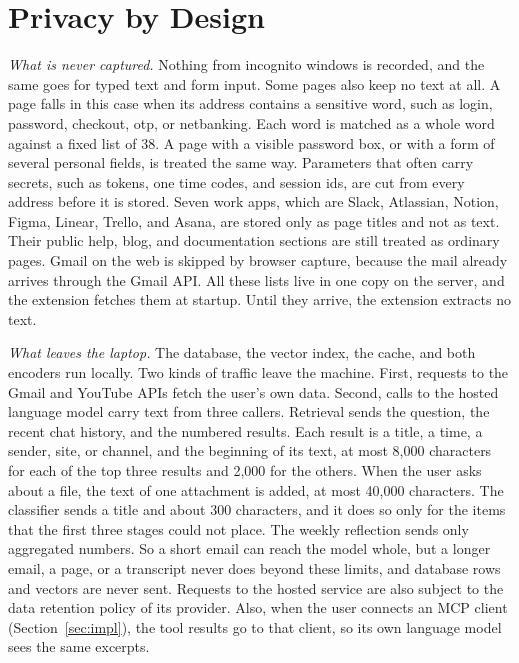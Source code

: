 \documentclass[conference]{IEEEtran}
\begin{document}
\section{Privacy by Design}\label{sec:privacy}
\textit{What is never captured.} Nothing from incognito windows is recorded, and the same goes for typed text and form input. Some pages also keep no text at all. A page falls in this case when its address contains a sensitive word, such as login, password, checkout, otp, or netbanking. Each word is matched as a whole word against a fixed list of 38. A page with a visible password box, or with a form of several personal fields, is treated the same way. Parameters that often carry secrets, such as tokens, one time codes, and session ids, are cut from every address before it is stored. Seven work apps, which are Slack, Atlassian, Notion, Figma, Linear, Trello, and Asana, are stored only as page titles and not as text. Their public help, blog, and documentation sections are still treated as ordinary pages. Gmail on the web is skipped by browser capture, because the mail already arrives through the Gmail API. All these lists live in one copy on the server, and the extension fetches them at startup. Until they arrive, the extension extracts no text.

\textit{What leaves the laptop.} The database, the vector index, the cache, and both encoders run locally. Two kinds of traffic leave the machine. First, requests to the Gmail and YouTube APIs fetch the user's own data. Second, calls to the hosted language model carry text from three callers. Retrieval sends the question, the recent chat history, and the numbered results. Each result is a title, a time, a sender, site, or channel, and the beginning of its text, at most 8,000 characters for each of the top three results and 2,000 for the others. When the user asks about a file, the text of one attachment is added, at most 40,000 characters. The classifier sends a title and about 300 characters, and it does so only for the items that the first three stages could not place. The weekly reflection sends only aggregated numbers. So a short email can reach the model whole, but a longer email, a page, or a transcript never does beyond these limits, and database rows and vectors are never sent. Requests to the hosted service are also subject to the data retention policy of its provider. Also, when the user connects an MCP client (Section~\ref{sec:impl}), the tool results go to that client, so its own language model sees the same excerpts.
\end{document}
